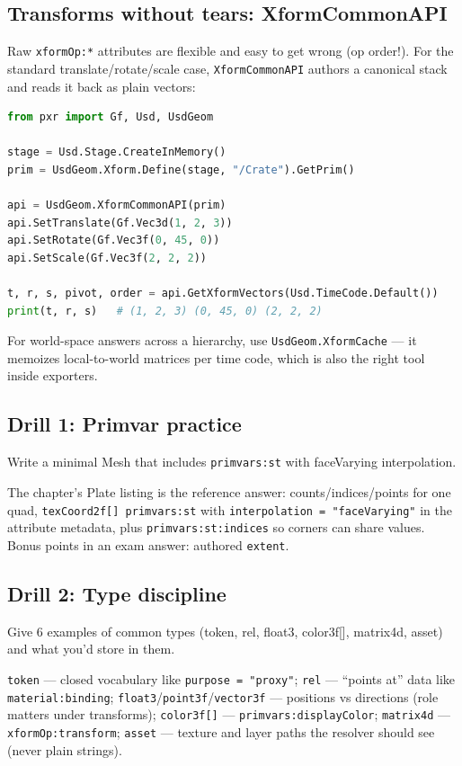 \subsection{Transforms without tears: XformCommonAPI}\label{sec:dm-xform}
Raw \texttt{xformOp:*} attributes are
flexible and easy to get wrong (op order!). For the standard
translate/rotate/scale case, \texttt{XformCommonAPI} authors a canonical
stack and reads it back as plain vectors:

\begin{lstlisting}[language=Python]
from pxr import Gf, Usd, UsdGeom

stage = Usd.Stage.CreateInMemory()
prim = UsdGeom.Xform.Define(stage, "/Crate").GetPrim()

api = UsdGeom.XformCommonAPI(prim)
api.SetTranslate(Gf.Vec3d(1, 2, 3))
api.SetRotate(Gf.Vec3f(0, 45, 0))
api.SetScale(Gf.Vec3f(2, 2, 2))

t, r, s, pivot, order = api.GetXformVectors(Usd.TimeCode.Default())
print(t, r, s)   # (1, 2, 3) (0, 45, 0) (2, 2, 2)
\end{lstlisting}

\noindent For world-space answers across a hierarchy, use
\texttt{UsdGeom.XformCache} --- it memoizes local-to-world matrices per time
code, which is also the right tool inside exporters.

\DrillsTitle
\subsection*{Drill 1: Primvar practice}
Write a minimal Mesh that includes \texttt{primvars:st} with faceVarying
interpolation.
\begin{DrillSolution}
The chapter's Plate listing is the reference answer: counts/indices/points
for one quad, \texttt{texCoord2f[] primvars:st} with
\texttt{interpolation = "faceVarying"} in the attribute metadata, plus
\texttt{primvars:st:indices} so corners can share values. Bonus points in an
exam answer: authored \texttt{extent}.
\end{DrillSolution}

\subsection*{Drill 2: Type discipline}
Give 6 examples of common types (token, rel, float3, color3f[], matrix4d,
asset) and what you'd store in them.
\begin{DrillSolution}
\texttt{token} --- closed vocabulary like \texttt{purpose = "proxy"};
\texttt{rel} --- ``points at'' data like \texttt{material:binding};
\texttt{float3}/\texttt{point3f}/\texttt{vector3f} --- positions vs
directions (role matters under transforms); \texttt{color3f[]} ---
\texttt{primvars:displayColor}; \texttt{matrix4d} ---
\texttt{xformOp:transform}; \texttt{asset} --- texture and layer paths the
resolver should see (never plain strings).
\end{DrillSolution}

